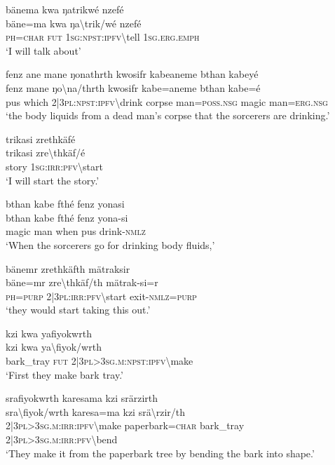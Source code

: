 \ea\label{ex:a4251}
bänema kwa ŋatrikwé nzefé\\
\gll bäne=ma	kwa	ŋa{\textbackslash}trik/wé	nzefé\\
     \textsc{ph}=\textsc{char}	\textsc{fut}	1\textsc{sg}:\textsc{npst}:\textsc{ipfv}{\textbackslash}tell	1\textsc{sg}.\textsc{erg}.\textsc{emph}\\
\glt `I will talk about'
\z

\ea\label{ex:a4252}
fenz ane mane ŋonathrth kwosifr kabeaneme bthan kabeyé\\
\gll fenz	mane	ŋo{\textbackslash}na/thrth	kwosifr	kabe=aneme	bthan	kabe=é\\
     pus	which	2|3\textsc{pl}:\textsc{npst}:\textsc{ipfv}{\textbackslash}drink	corpse	man=\textsc{poss}.\textsc{nsg}	magic	man=\textsc{erg}.\textsc{nsg}\\
\glt `the body liquids from a dead man's corpse that the sorcerers are drinking.'
\z

\ea\label{ex:a4254}
trikasi zrethkäfé\\
\gll trikasi	zre{\textbackslash}thkäf/é\\
     story	1\textsc{sg}:\textsc{irr}:\textsc{pfv}{\textbackslash}start\\
\glt `I will start the story.'
\z

\ea\label{ex:a4255}
bthan kabe fthé fenz yonasi\\
\gll bthan	kabe	fthé	fenz	yona-si\\
     magic	man	when	pus	drink-\textsc{nmlz}\\
\glt `When the sorcerers go for drinking body fluids,'
\z

\ea\label{ex:a4256}
bänemr zrethkäfth mätraksir\\
\gll bäne=mr	zre{\textbackslash}thkäf/th	mätrak-si=r\\
     \textsc{ph}=\textsc{purp}	2|3\textsc{pl}:\textsc{irr}:\textsc{pfv}{\textbackslash}start	exit-\textsc{nmlz}=\textsc{purp}\\
\glt `they would start taking this out.'
\z

\ea\label{ex:a4257}
kzi kwa yafiyokwrth\\
\gll kzi	kwa	ya{\textbackslash}fiyok/wrth\\
     bark\_tray	\textsc{fut}	2|3\textsc{pl}>3\textsc{sg}.\textsc{m}:\textsc{npst}:\textsc{ipfv}{\textbackslash}make\\
\glt `First they make bark tray.'
\z

\ea\label{ex:a4258}
srafiyokwrth karesama kzi srärzirth\\
\gll sra{\textbackslash}fiyok/wrth	karesa=ma	kzi	srä{\textbackslash}rzir/th\\
     2|3\textsc{pl}>3\textsc{sg}.\textsc{m}:\textsc{irr}:\textsc{ipfv}{\textbackslash}make	paperbark=\textsc{char}	bark\_tray	2|3\textsc{pl}>3\textsc{sg}.\textsc{m}:\textsc{irr}:\textsc{pfv}{\textbackslash}bend\\
\glt `They make it from the paperbark tree by bending the bark into shape.'
\z

